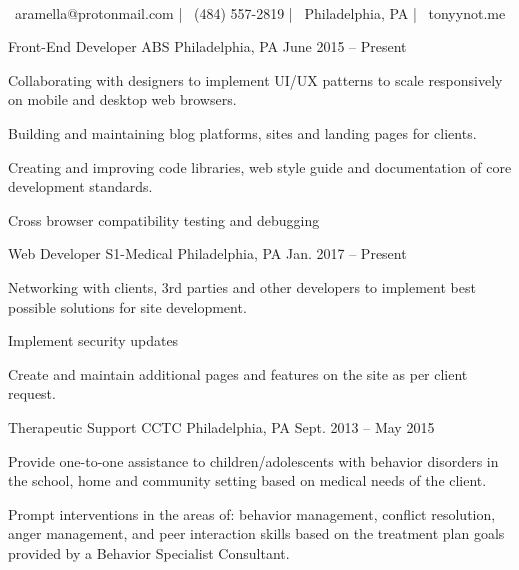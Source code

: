 \documentclass[]{awesome-cv}
\begin{document}
    
\begin{center}
	  \\
	\vspace{2mm}
	{\faEnvelope\ aramella@protonmail.com} | {\faMobile\ (484) 557-2819} | {\faMapMarker\ Philadelphia, PA} | {\faLink\ tonyynot.me}
\end{center}
\begin{cventries}
	\cventry
	{Front-End Developer}
	{ABS}
	{Philadelphia, PA}
	{June 2015 – Present}
	{\begin{cvitems}
		\item {Collaborating with designers to implement UI/UX patterns to scale responsively on mobile and desktop web browsers.}
		\item {Building and maintaining blog platforms, sites and landing pages for clients.}
		\item {Creating and improving code libraries, web style guide and documentation of core development standards.}
		\item {Cross browser compatibility testing and debugging}
		\end{cvitems}}
	\cventry
	{Web Developer}
	{S1-Medical}
	{Philadelphia, PA}
	{Jan. 2017 – Present}
	{\begin{cvitems}
		\item {Networking with clients, 3rd parties and other developers to implement best possible solutions for site development.}
		\item {Implement security updates}
		\item {Create and maintain additional pages and features on the site as per client request.}
		\end{cvitems}}
	\cventry
	{Therapeutic Support}
	{CCTC}
	{Philadelphia, PA}
	{Sept. 2013 – May 2015}
	{\begin{cvitems}
		\item {Provide one-to-one assistance to children/adolescents with behavior disorders in the school, home and community setting based on medical needs of the client.}
		\item {Prompt interventions in the areas of: behavior management, conflict resolution, anger management, and peer interaction skills based on the treatment plan goals provided by a Behavior Specialist Consultant.}

\end{cvitems}}
\end{cventries}
\end{document}
